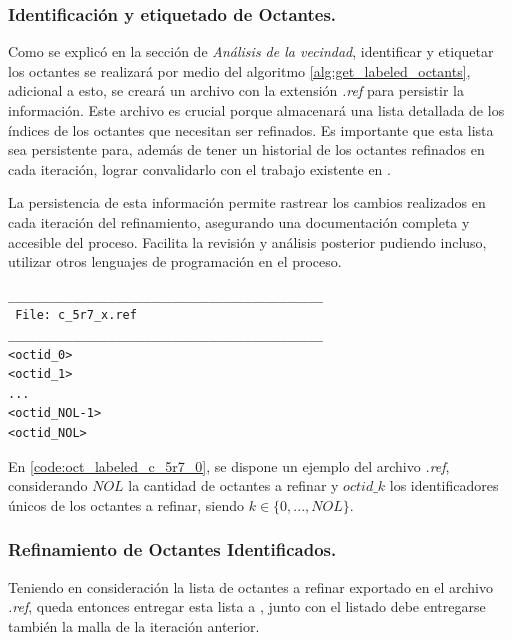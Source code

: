 

\subsubsection{Identificación y etiquetado de Octantes.}

Como se explicó en la sección de \textit{Análisis de la vecindad}, identificar y etiquetar los octantes se realizará por medio del algoritmo \ref{alg:get_labeled_octants}, adicional a esto, se creará un archivo con la extensión \textit{.ref} para persistir la información. Este archivo es crucial porque almacenará una lista detallada de los índices de los octantes que necesitan ser refinados. Es importante que esta lista sea persistente para, además de tener un historial de los octantes refinados en cada iteración, lograr convalidarlo con el trabajo existente en \mesher{}.

La persistencia de esta información permite rastrear los cambios realizados en cada iteración del refinamiento, asegurando una documentación completa y accesible del proceso. Facilita la revisión y análisis posterior pudiendo incluso, utilizar otros lenguajes de programación en el proceso.

\begin{lstlisting}[style=TxtStyle,caption={Lista de octantes a refinar en malla inicial.\\ Fuente: Elaboración propia.},label={code:oct_labeled_c_5r7_0}]
____________________________________________
 File: c_5r7_x.ref 
____________________________________________
<octid_0>
<octid_1>
...
<octid_NOL-1>
<octid_NOL>
\end{lstlisting}

En \autoref{code:oct_labeled_c_5r7_0}, se dispone un ejemplo del archivo \textit{.ref}, considerando $NOL$ la cantidad de octantes a refinar y $octid\_k$ los identificadores únicos de los octantes a refinar, siendo $k \in \{ 0, ..., NOL\}$.

\subsubsection{Refinamiento de Octantes Identificados.}

Teniendo en consideración la lista de octantes a refinar exportado en el archivo \textit{.ref}, queda entonces entregar esta lista a \mesher{}, junto con el listado debe entregarse también la malla de la iteración anterior.

